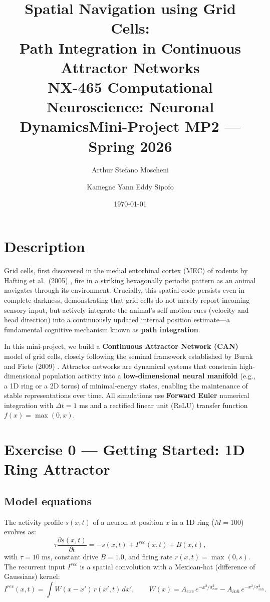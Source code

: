 \documentclass[10pt, a4paper]{article}
\title{
    \textbf{Spatial Navigation using Grid Cells:}\\
    \textbf{Path Integration in Continuous Attractor Networks}\\[0.3em]
    \large NX-465 Computational Neuroscience: Neuronal Dynamics\quad Mini-Project MP2 --- Spring 2026
}
\author{
    Arthur Stefano Moscheni \and Kamegne Yann Eddy Sipofo
}
\date{\today}
\begin{document}
\maketitle
\tableofcontents
\newpage

\section{Description}
Grid cells, first discovered in the medial entorhinal cortex (MEC) of rodents by Hafting et al.\ (2005) \cite{hafting2005}, fire in a striking hexagonally periodic pattern as an animal navigates through its environment. Crucially, this spatial code persists even in complete darkness, demonstrating that grid cells do not merely report incoming sensory input, but actively integrate the animal's self-motion cues (velocity and head direction) into a continuously updated internal position estimate---a fundamental cognitive mechanism known as \textbf{path integration}.

In this mini-project, we build a \textbf{Continuous Attractor Network (CAN)} model of grid cells, closely following the seminal framework established by Burak and Fiete (2009) \cite{burak2009}. Attractor networks are dynamical systems that constrain high-dimensional population activity into a \textbf{low-dimensional neural manifold} (e.g., a 1D ring or a 2D torus) of minimal-energy states, enabling the maintenance of stable representations over time. All simulations use \textbf{Forward Euler} numerical integration with $\Delta t = 1$ ms and a rectified linear unit (ReLU) transfer function $f(x) = \max(0, x)$.


\section{Exercise 0 --- Getting Started: 1D Ring Attractor}

\subsection{Model equations}

The activity profile $s(x,t)$ of a neuron at position $x$ in a 1D ring ($M=100$) evolves as:
\begin{equation}
    \tau \frac{\partial s(x,t)}{\partial t} = -s(x,t) + I^{rec}(x,t) + B(x,t),
    \label{eq:ring_dyn}
\end{equation}
with $\tau = 10$ ms, constant drive $B=1.0$, and firing rate $r(x,t)=\max(0,s)$. The recurrent input $I^{rec}$ is a spatial convolution with a Mexican-hat (difference of Gaussians) kernel:
\begin{equation}
    I^{rec}(x,t) = \int W(x-x')\,r(x',t)\,dx', \qquad
    W(x) = A_{exc}\,e^{-x^2/\sigma_{exc}^2} - A_{inh}\,e^{-x^2/\sigma_{inh}^2}.
    \label{eq:kernel1d}
\end{equation}
\end{document}
